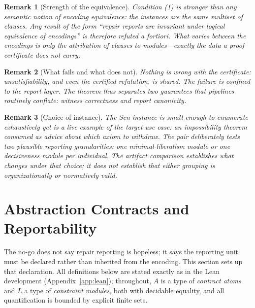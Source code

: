 \documentclass[sigplan,10pt,review,anonymous,nonacm]{acmart}
\theoremstyle{acmdefinition}
\newtheorem{remark}{Remark}
\begin{document}
\begin{remark}[Strength of the equivalence]
Condition (1) is stronger than any semantic notion of encoding equivalence:
the instances are the \emph{same multiset of clauses}. Any result of the form
``repair reports are invariant under logical equivalence of encodings''
is therefore refuted a fortiori. What varies between the encodings is only
the attribution of clauses to modules---exactly the data a proof certificate
does not carry.
\end{remark}

\begin{remark}[What fails and what does not]
Nothing is wrong with the certificate: unsatisfiability, and even the
certified refutation, is shared. The failure is confined to the report layer.
The theorem thus separates two guarantees that pipelines routinely conflate:
\emph{witness correctness} and \emph{report canonicity}.
\end{remark}

\begin{remark}[Choice of instance]
The Sen instance is small enough to enumerate exhaustively yet is a live
example of the target use case: an impossibility theorem consumed as advice
about which axiom to withdraw. The pair deliberately tests two plausible
reporting granularities: one minimal-liberalism module or one decisiveness
module per individual. The artifact comparison establishes what changes under
that choice; it does not establish that either grouping is organizationally or
normatively valid.
\end{remark}

\section{Abstraction Contracts and Reportability}
\label{sec:contracts}

The no-go does not say repair reporting is hopeless; it says the reporting
unit must be declared rather than inherited from the encoding. This section
sets up that declaration. All definitions below are stated exactly as in the
Lean development (Appendix~\ref{app:lean}); throughout, $A$ is a type of
\emph{contract atoms} and $L$ a type of \emph{constraint modules}, both with
decidable equality, and all quantification is bounded by explicit finite
sets.
\end{document}
